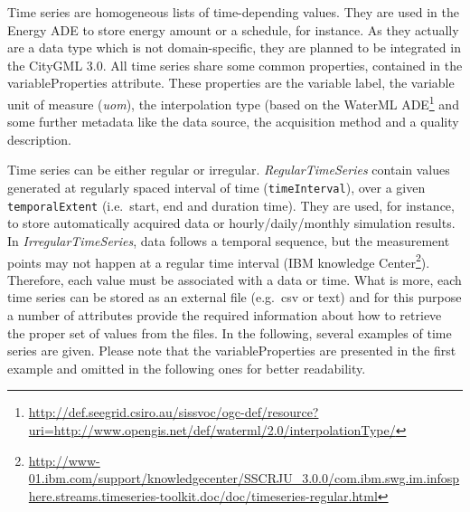 \documentclass[a4paper,12pt]{article}
\renewcommand{\href}[2]{#2\footnote{\url{#1}}}
\begin{document}
Time series are homogeneous lists of time-depending values. They are
used in the Energy ADE to store energy amount or a schedule, for
instance. As they actually are a data type which is not domain-specific,
they are planned to be integrated in the CityGML 3.0. All time series
share some common properties, contained in the variableProperties
attribute. These properties are the variable label, the variable unit of
measure (\emph{uom}), the interpolation type (based on the
\href{http://def.seegrid.csiro.au/sissvoc/ogc-def/resource?uri=http://www.opengis.net/def/waterml/2.0/interpolationType/}{WaterML
ADE} and some further metadata like the data source, the acquisition
method and a quality description.

Time series can be either regular or irregular. \emph{RegularTimeSeries}
contain values generated at regularly spaced interval of time
(\texttt{timeInterval}), over a given \texttt{temporalExtent}
(i.e.~start, end and duration time). They are used, for instance, to
store automatically acquired data or hourly/daily/monthly simulation
results. In \emph{IrregularTimeSeries}, data follows a temporal
sequence, but the measurement points may not happen at a regular time
interval
(\href{http://www-01.ibm.com/support/knowledgecenter/SSCRJU_3.0.0/com.ibm.swg.im.infosphere.streams.timeseries-toolkit.doc/doc/timeseries-regular.html}{IBM
knowledge Center}). Therefore, each value must be associated with a data
or time. What is more, each time series can be stored as an external
file (e.g.~csv or text) and for this purpose a number of attributes
provide the required information about how to retrieve the proper set of
values from the files. In the following, several examples of time series
are given. Please note that the variableProperties are presented in the
first example and omitted in the following ones for better readability.
\end{document}
